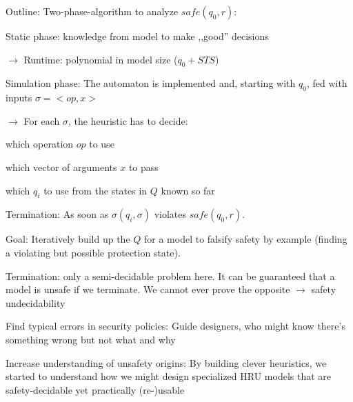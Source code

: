 \documentclass[a4paper]{article}
\begin{document}
\begin{multicols}{3}
    Outline: Two-phase-algorithm to analyze $safe(q_0,r)$:
    \begin{enumerate*}
        \item Static phase: knowledge from model to make ,,good'' decisions
        \begin{itemize*}
            \item[$\rightarrow$] Runtime: polynomial in model size ($q_0 + STS$)
        \end{itemize*}
        \item Simulation phase: The automaton is implemented and, starting with $q_0$, fed with inputs $\sigma=<op,x>$
        \begin{itemize*}
            \item[$\rightarrow$] For each $\sigma$, the heuristic has to decide:
            \item which operation $op$ to use
            \item which vector of arguments $x$ to pass
            \item which $q_i$ to use from the states in $Q$ known so far
            \item Termination: As soon as $\sigma(q_i,\sigma)$ violates $safe(q_0,r)$.
        \end{itemize*}
    \end{enumerate*}

    Goal: Iteratively build up the $Q$ for a model to falsify safety by example (finding a violating but possible protection state).

    Termination: only a semi-decidable problem here. It can be guaranteed that a model is unsafe if we terminate. We cannot ever prove the opposite $\rightarrow$ safety undecidability
    \begin{itemize*}
        \item Find typical errors in security policies: Guide designers, who might know there’s something wrong but not what and why
        \item Increase understanding of unsafety origins: By building clever heuristics, we started to understand how we might design specialized HRU models that are safety-decidable yet practically (re-)usable
    \end{itemize*}


\end{multicols}
\end{document}
